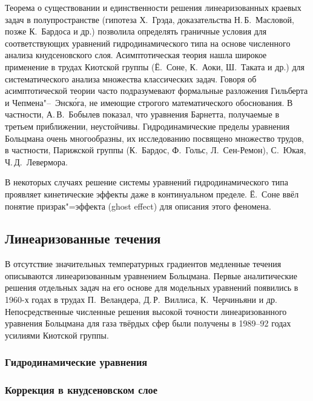 Теорема о существовании и единственности решения линеаризованных краевых задач в полупространстве
(гипотеза Х.~Грэда, доказательства Н.\,Б.~Масловой, позже К.~Бардоса и др.)
позволила определять граничные условия для соответствующих уравнений гидродинамического типа
на основе численного анализа кнудсеновского слоя.
Асимптотическая теория нашла широкое применение в трудах Киотской группы
(Ё.~Соне, К.~Аоки, Ш.~Таката и др.) для систематического анализа множества классических задач.
Говоря об асимптотической теории часто подразумевают формальные разложения Гильберта и Чепмена"--~Энск\'{о}га,
не имеющие строгого математического обоснования. В частности, А.\,В.~Бобылев показал,
что уравнения Барнетта, получаемые в третьем приближении, неустойчивы.
Гидродинамические пределы уравнения Больцмана очень многообразны, их исследованию
посвящено множество трудов, в частности, Парижской группы (К.~Бардос, Ф.~Гольс, Л.~Сен-Ремон),
С.~Юкая, Ч.\,Д.~Левермора.

В некоторых случаях решение системы уравнений гидродинамического типа
проявляет кинетические эффекты даже в континуальном пределе.
Ё.~Соне ввёл понятие призрак"=эффекта (ghost effect) для описания этого феномена.


\subsection{Линеаризованные течения}

В отсутствие значительных температурных градиентов медленные течения описываются
линеаризованным уравнением Больцмана. Первые аналитические решения отдельных задач на его основе
для модельных уравнений появились в 1960-х годах в трудах П.~Веландера, Д.\,Р.~Виллиса, К.~Черчиньяни и др.
Непосредственные численные решения высокой точности линеаризованного уравнения Больцмана
для газа твёрдых сфер были получены в 1989--92 годах усилиями Киотской группы.

\subsubsection{Гидродинамические уравнения}
\subsubsection{Коррекция в кнудсеновском слое}


